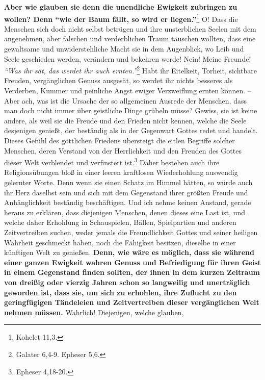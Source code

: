 \label{ref:15_06_langeweile}
\textbf{Aber wie glauben sie denn die unendliche Ewigkeit zubringen zu wollen?
Denn
"`wie der Baum fällt, so wird er liegen."'}\footnote{Kohelet 11,3. }
O! Dass die Menschen sich doch nicht selbst
betrügen und ihre unsterblichen Seelen mit dem angenehmen, aber falschen und
verderblichen Traum täuschen wollten, dass eine gewaltsame und unwiderstehliche
Macht sie in dem Augenblick, wo Leib und Seele geschieden werden, verändern und
bekehren werde! Nein! Meine Freunde!
\textit{"`Was ihr sät, das werdet ihr auch ernten."'}\footnote{Galater 6,4-9.
Epheser 5,6.}
Habt ihr Eitelkeit, Torheit,
sichtbare Freuden, vergänglichen Genuss ausgesät, so werdet ihr nichts besseres
als Verderben, Kummer und peinliche Angst ewiger Verzweiflung ernten können. --
Aber ach, was ist die Ursache der so allgemeinen Ausrede der Menschen, dass man
doch nicht immer über geistliche Dinge grübeln müsse? Gewiss, sie ist keine
andere, als weil sie die Freude und den Frieden nicht kennen, welche die Seele
desjenigen genießt, der beständig als in der Gegenwart
Gottes redet und handelt.
Dieses Gefühl des göttlichen Friedens übersteigt die eitlen Begriffe solcher
Menschen, deren Verstand von der Herrlichkeit und den Freuden des Gottes dieser
Welt verblendet und verfinstert ist.\footnote{Epheser 4,18-20.}
Daher bestehen
auch ihre Religionsübungen bloß in einer leeren kraftlosen Wiederhohlung
auswendig gelernter Worte. Denn wenn sie einen Schatz im Himmel hätten, so würde
auch ihr Herz daselbst sein und sich mit dem Gegenstand ihrer größten Freude
und Anhänglichkeit beständig beschäftigen. Und ich nehme keinen Anstand, gerade
heraus zu erklären, dass diejenigen Menschen, denen dieses eine Last ist, und
welche daher Erhohlung in Schauspielen, Bällen, Spielpartien
und anderen
Zeitvertreiben suchen, weder jemals die Freundlichkeit Gottes und seiner
heiligen Wahrheit geschmeckt haben, noch die Fähigkeit besitzen, dieselbe in
einer künftigen Welt zu genießen. \textbf{Denn, wie wäre es möglich, dass sie
während
einer ganzen Ewigkeit wahren Genuss und Befriedigung für ihren Geist in einem
Gegenstand finden sollten, der ihnen in dem kurzen Zeitraum von dreißig oder
vierzig Jahren schon so langweilig und unerträglich geworden ist, dass sie, um
sich zu erhohlen, ihre Zuflucht zu den geringfügigen Tändeleien und
Zeitvertreiben dieser vergänglichen Welt nehmen müssen.} Wahrlich! Diejenigen,
welche glauben,
